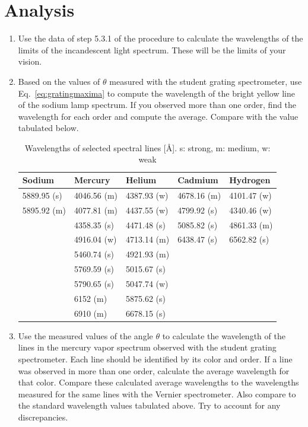 \section{Analysis}

\begin{enumerate}
\item Use the data of step 5.3.1 of the procedure to calculate the
wavelengths of the limits of the incandescent light spectrum.  These
will be the limits of your vision.

\item Based on the values of ${\theta}$ measured with the student grating
spectrometer, use Eq.~\ref{eq:gratingmaxima} to compute the wavelength of the bright
yellow line of the sodium lamp spectrum.  If you observed more than
one order, find the wavelength for each order and compute the average.
 Compare with the value tabulated below.

\begin{table}
\begin{tabular}{ l | l | l | l | l}
  Sodium & Mercury & Helium & Cadmium & Hydrogen \\
\hline
5889.95 (s) & 4046.56 (m) & 4387.93 (w) & 4678.16 (m) & 4101.47 (w) \\
5895.92 (m) & 4077.81 (m) & 4437.55 (w) & 4799.92 (s) &  4340.46 (w)\\
		 & 4358.35 (s) & 4471.48 (s) & 5085.82 (s) & 4861.33 (m) \\
		 & 4916.04 (w) & 4713.14 (m) & 6438.47 (s) &  6562.82 (s)\\
		 & 5460.74 (s) & 4921.93 (m) &  & \\
		 & 5769.59 (s) & 5015.67 (s) &  & \\
		 & 5790.65 (s) & 5047.74 (w) &  & \\
		 & 6152    (m) & 5875.62 (s) &  & \\
		 & 6910    (m) & 6678.15 (s) &  & \\
\end{tabular}
\caption{Wavelengths of selected spectral lines [\AA].  s: strong, m: medium, w: weak}
\end{table}


\item Use the measured values of the angle ${\theta}$ to calculate the
wavelength of the lines in the mercury vapor spectrum observed with the
student grating spectrometer.  Each line should be identified by its
color and order. If a line was observed in more than one order,
calculate the average wavelength for that color.  Compare these
calculated average wavelengths to the wavelengths measured for the same
lines with the Vernier spectrometer.
Also compare to the standard wavelength values
tabulated above.  Try to account for any discrepancies.


\end{enumerate}

